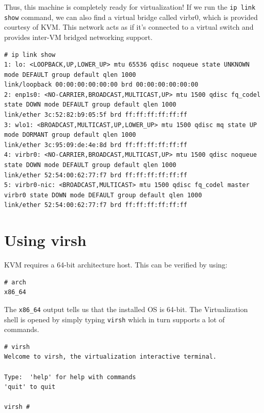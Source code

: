 Thus, this machine is completely ready for virtualization! If we run the \verb|ip link show| command, we can also find a virtual bridge called virbr0, which is provided courtesy of KVM. This network acts as if it's connected to a virtual switch and provides inter-VM bridged networking support. 

\vspace{-15pt}
\begin{verbatim}
# ip link show
1: lo: <LOOPBACK,UP,LOWER_UP> mtu 65536 qdisc noqueue state UNKNOWN mode DEFAULT group default qlen 1000
link/loopback 00:00:00:00:00:00 brd 00:00:00:00:00:00
2: enp1s0: <NO-CARRIER,BROADCAST,MULTICAST,UP> mtu 1500 qdisc fq_codel state DOWN mode DEFAULT group default qlen 1000
link/ether 3c:52:82:b9:05:5f brd ff:ff:ff:ff:ff:ff
3: wlo1: <BROADCAST,MULTICAST,UP,LOWER_UP> mtu 1500 qdisc mq state UP mode DORMANT group default qlen 1000
link/ether 3c:95:09:de:4e:8d brd ff:ff:ff:ff:ff:ff
4: virbr0: <NO-CARRIER,BROADCAST,MULTICAST,UP> mtu 1500 qdisc noqueue state DOWN mode DEFAULT group default qlen 1000
link/ether 52:54:00:62:77:f7 brd ff:ff:ff:ff:ff:ff
5: virbr0-nic: <BROADCAST,MULTICAST> mtu 1500 qdisc fq_codel master virbr0 state DOWN mode DEFAULT group default qlen 1000
link/ether 52:54:00:62:77:f7 brd ff:ff:ff:ff:ff:ff
\end{verbatim}
\vspace{-10pt}

	\section{Using virsh}
KVM requires a 64-bit architecture host. This can be verified by using:

\vspace{-15pt}
\begin{verbatim}
# arch
x86_64
\end{verbatim}
\vspace{-10pt}

\noindent
The \verb|x86_64| output tells us that the installed OS is 64-bit. The Virtualization shell is opened by simply typing \verb|virsh| which in turn supports a lot of commands. 

\vspace{-15pt}
\begin{verbatim}
# virsh
Welcome to virsh, the virtualization interactive terminal.

Type:  'help' for help with commands
'quit' to quit

virsh # 
\end{verbatim}
\vspace{-10pt}


